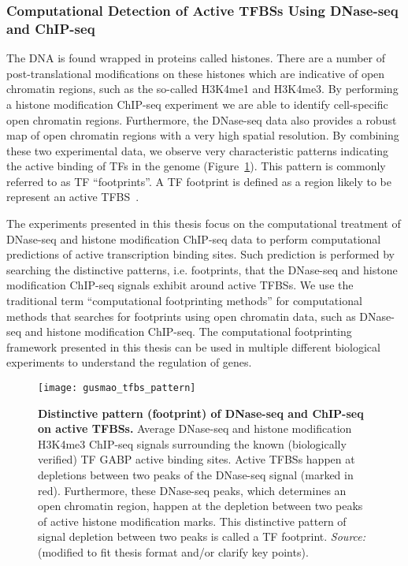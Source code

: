 \subsubsection{Computational Detection of Active TFBSs Using DNase-seq and ChIP-seq}

The DNA is found wrapped in proteins called histones. There are a number of post-translational modifications on these histones which are indicative of open chromatin regions, such as the so-called H3K4me1 and H3K4me3. By performing a histone modification ChIP-seq experiment we are able to identify cell-specific open chromatin regions. Furthermore, the DNase-seq data also provides a robust map of open chromatin regions with a very high spatial resolution. By combining these two experimental data, we observe very characteristic patterns indicating the active binding of TFs in the genome (Figure~\ref{fig:gusmao_tfbs_pattern}). This pattern is commonly referred to as TF ``footprints''. A TF footprint is defined as a region likely to be represent an active TFBS~\citep{boyle2011,gusmao2012}.

The experiments presented in this thesis focus on the computational treatment of DNase-seq and histone modification ChIP-seq data to perform computational predictions of active transcription binding sites. Such prediction is performed by searching the distinctive patterns, i.e. footprints, that the DNase-seq and histone modification ChIP-seq signals exhibit around active TFBSs. We use the traditional term ``computational footprinting methods'' for computational methods that searches for footprints using open chromatin data, such as DNase-seq and histone modification ChIP-seq. The computational footprinting framework presented in this thesis can be used in multiple different biological experiments to understand the regulation of genes.

\begin{figure}[h!]
\centering
\texttt{[image: gusmao\_tfbs\_pattern]}
\caption[Distinctive pattern (footprint) of DNase-seq and ChIP-seq on active TFBSs]{\textbf{Distinctive pattern (footprint) of DNase-seq and ChIP-seq on active TFBSs.} Average DNase-seq and histone modification H3K4me3 ChIP-seq signals surrounding the known (biologically verified) TF GABP active binding sites. Active TFBSs happen at depletions between two peaks of the DNase-seq signal (marked in red). Furthermore, these DNase-seq peaks, which determines an open chromatin region, happen at the depletion between two peaks of active histone modification marks. This distinctive pattern of signal depletion between two peaks is called a TF footprint. \emph{Source:~\cite{gusmao2012}} (modified to fit thesis format and/or clarify key points).}
\label{fig:gusmao_tfbs_pattern}
\end{figure}

